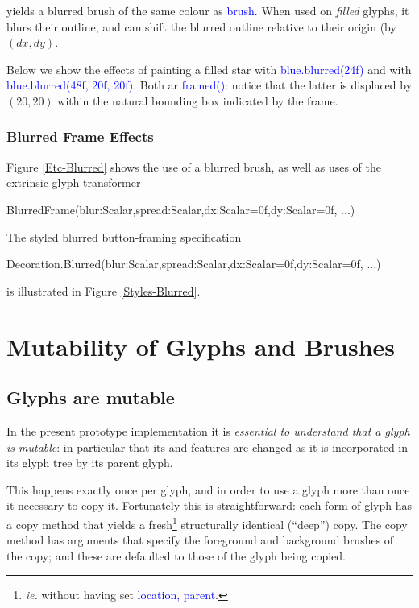\documentclass[12pt,a4paper]{article}
\def\Scala#1{\textcolor{blue}{\textsf{#1}}}
\def\S#1{\section{#1}}
\def\SS#1{\subsection{#1}}
\def\SSS#1{\subsubsection*{#1}}
\begin{document}
yields a blurred brush of the same colour as \Scala{brush}. When
used on \textit{filled} glyphs, it blurs their outline, and
can shift the blurred outline relative to their origin (by $(dx, dy)$.

Below we show the effects of painting a filled star with
\Scala{blue.blurred(24f)} and with \Scala{blue.blurred(48f, 20f, 20f)}.
Both ar \Scala{framed()}: notice that the latter is displaced by $(20, 20)$ within the
natural bounding box indicated by the frame.

\begin{center}
\quad\quad
{}
\end{center}



\SSS{Blurred Frame Effects}
Figure \ref{Etc-Blurred} shows the use of a blurred brush, as
well as uses of the extrinsic glyph transformer

\begin{scala}
   BlurredFrame(blur:Scalar,spread:Scalar,dx:Scalar=0f,dy:Scalar=0f, ...)
\end{scala}

The styled blurred button-framing specification 

\begin{scala}
   Decoration.Blurred(blur:Scalar,spread:Scalar,dx:Scalar=0f,dy:Scalar=0f, ...)
\end{scala}

is illustrated in Figure \ref{Styles-Blurred}.

\clearpage

\appendix
\S{Mutability of Glyphs and Brushes}
\SS{Glyphs are mutable}\label{glyphsaremutable}
In the present prototype implementation it is \textit{essential to understand that a glyph 
is mutable}: in particular that its  and  features are changed as it is
incorporated in its glyph tree by its parent glyph.

This happens exactly once per glyph, and in order to use a glyph
more than once it necessary to copy it. Fortunately this is
straightforward: each form of glyph has a copy method that yields
a fresh\footnote{\textit{ie.} without having set
\textcolor{blue}{\textsf{location, parent}}.} structurally identical
(``deep'') copy. The copy method has  arguments that
specify the foreground and background brushes of the copy; and these
are defaulted to those of the glyph being copied.
\end{document}
